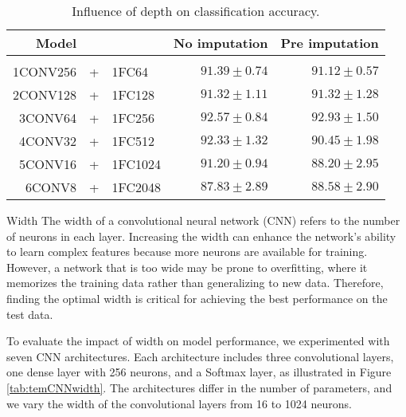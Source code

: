 \begin{table}[H]
  \centering
   \begin{tabular}{rclrr}
   Model&&                  & No imputation         & Pre imputation             \\[0.2cm]
   \hline \\[-0.2cm]
   1CONV256 &+& 1FC64   	 & $91.39 \pm 0.74$ 	 & $91.12 \pm 0.57$\\
   2CONV128 &+& 1FC128  	 & $91.32 \pm 1.11$ 	 & $91.32 \pm 1.28$\\
   3CONV64 &+& 1FC256   	 & $\mathbf{92.57 \pm 0.84}$ 	 & $\mathbf{92.93 \pm 1.50}$\\
   4CONV32 &+& 1FC512   	 & $92.33 \pm 1.32$ 	 & $90.45 \pm 1.98$\\
   5CONV16 &+& 1FC1024  	 & $91.20 \pm 0.94$ 	 & $88.20 \pm 2.95$\\
   6CONV8 &+& 1FC2048   	 & $87.83 \pm 2.89$ 	 & $88.58 \pm 2.90$\\
   \end{tabular}
   \caption{Influence of depth on classification accuracy.}
   \label{tab:temCNNdepth}
 \end{table}

\begin{paragraph}{Width}
The width of a convolutional neural network (CNN) refers to the number of neurons in each layer.
Increasing the width can enhance the network's ability to learn complex features because more neurons are available for training.
However, a network that is too wide may be prone to overfitting, where it memorizes the training data rather than generalizing to new data.
Therefore, finding the optimal width is critical for achieving the best performance on the test data.
\end{paragraph}

To evaluate the impact of width on model performance, we experimented with seven CNN architectures.
Each architecture includes three convolutional layers, one dense layer with 256 neurons, and a Softmax layer, as illustrated in Figure \ref{tab:temCNNwidth}.
The architectures differ in the number of parameters, and we vary the width of the convolutional layers from 16 to 1024 neurons.

